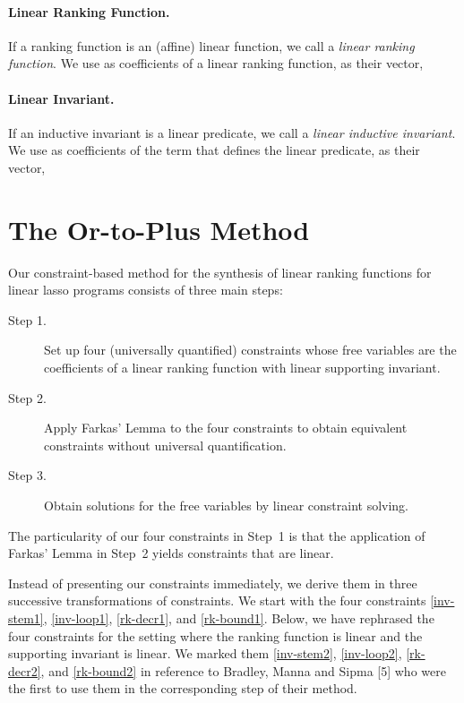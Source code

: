 \documentclass[a4paper]{llncs}
\newcommand{\defo}[1]{\emph{#1}}
\begin{document}
\paragraph{Linear Ranking Function.}
If a ranking function  is an (affine) linear function, we call  a \defo{linear ranking function}.
We use  as coefficients of a linear ranking function,  as their vector,



\paragraph{Linear Invariant.}
If an inductive invariant  is a linear predicate, we call  a \defo{linear inductive invariant}. 
We use  as coefficients of the term that defines the linear predicate,  as their vector,










\section[The Or-to-Plus Method]{The Or-to-Plus Method}

Our constraint-based method for the synthesis of linear ranking functions for linear lasso programs consists of three main steps:
\begin{description}
 \item[Step 1.] Set up four (universally quantified) constraints whose free variables are the coefficients of a linear ranking function with linear supporting invariant.
 \item[Step 2.] Apply Farkas' Lemma to the four constraints to obtain equivalent constraints without universal quantification.
 \item[Step 3.] Obtain solutions for the free variables by linear constraint solving.
\end{description}

The particularity of  our four constraints in Step~1
is that the application of Farkas' Lemma in Step~2 yields constraints that are linear.

Instead of presenting our constraints immediately, we derive them in three successive transformations of constraints.
We start with the four constraints \eqref{inv-stem1}, \eqref{inv-loop1}, \eqref{rk-decr1}, and \eqref{rk-bound1}.
Below, we have rephrased the four constraints for the setting where the ranking function is linear and the supporting invariant is linear.
We marked them \eqref{inv-stem2}, \eqref{inv-loop2}, \eqref{rk-decr2}, and \eqref{rk-bound2} in reference to Bradley, Manna and Sipma [5] who were the first to use them in the corresponding step of their method.
\end{document}
